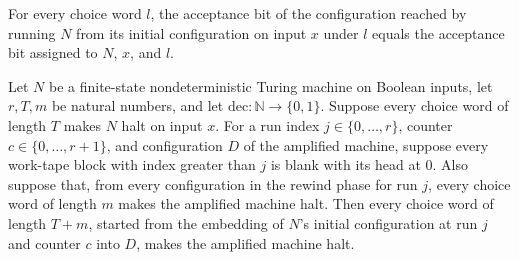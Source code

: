 \begin{theorem}
\label{Randomized.Amplify.accBit_runWith}
\leanok
{}
For every choice word $l$, the acceptance bit of the configuration reached by running
$N$ from its initial configuration on input $x$ under $l$ equals the acceptance bit
assigned to $N$, $x$, and $l$.
\end{theorem}

\begin{theorem}
\label{Randomized.Amplify.run_halts}
\leanok
{}
Let $N$ be a finite-state nondeterministic Turing machine on Boolean inputs, let $r,T,m$
be natural numbers, and let $\mathrm{dec}:\mathbb{N}\to\{0,1\}$. Suppose every choice
word of length $T$ makes $N$ halt on input $x$. For a run index $j\in\{0,\ldots,r\}$,
counter $c\in\{0,\ldots,r+1\}$, and configuration $D$ of the amplified machine, suppose
every work-tape block with index greater than $j$ is blank with its head at $0$. Also
suppose that, from every configuration in the rewind phase for run $j$, every choice
word of length $m$ makes the amplified machine halt. Then every choice word of length
$T+m$, started from the embedding of $N$’s initial configuration at run $j$ and counter
$c$ into $D$, makes the amplified machine halt.
\end{theorem}

